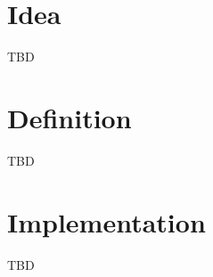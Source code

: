 \documentclass{article}
\begin{document}
\section*{Idea}
TBD


\section*{Definition}
TBD


\section*{Implementation}
TBD
\end{document}
